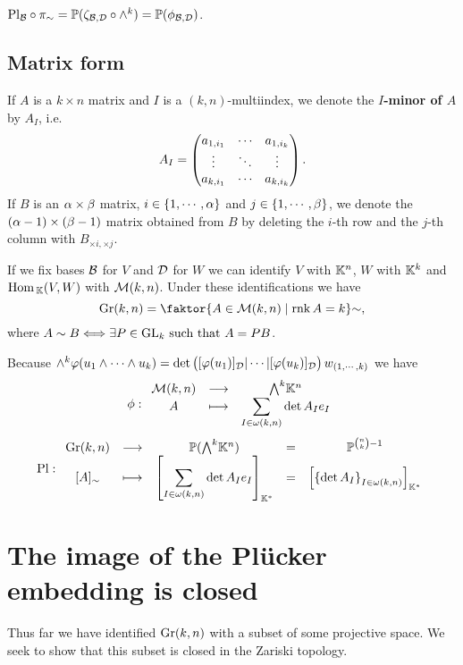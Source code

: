 \begin{remark}
$\mathrm{Pl}_{\mathcal{B}}\circ \pi_\sim=\mathbb{P}(\zeta_{\mathcal{B},\mathcal{D}}\circ\wedge^k)=\mathbb{P}(\phi_{\mathcal{B},\mathcal{D}})$.
\end{remark}



\subsection{Matrix form}
\begin{notation}
If $A$ is a $k\times n$ matrix and $I$ is a $(k,n)$-multiindex, we denote the \textbf{$I$-minor of $A$} by $A_I$, i.e.
\[A_I=\begin{pmatrix}a_{1,i_1} &\cdots &a_{1,i_{k}}\\\vdots &\ddots &\vdots\\a_{k,i_1}&\cdots&a_{k,i_k}\end{pmatrix}.\]
If $B$ is an $\alpha\times \beta$ matrix, $i\in\left\{{1,\cdots, \alpha}\right\}$ and $j\in \left\{{1,\cdots, \beta}\right\}$, we denote the $(\alpha-1)\times (\beta-1)$ matrix obtained from $B$ by deleting the $i$-th row and the $j$-th column with $B_{\times i,\times j}$.
\end{notation}
If we fix bases $\mathcal{B}$ for $V$ and $\mathcal{D}$ for $W$ we can identify $V$ with $\mathbb{K}^n$, $W$ with $\mathbb{K}^k$ and $\mathrm{Hom}\,_{\mathbb{K}}(V,W)$ with $\mathcal{M}(k,n)$. Under these identifications we have 
\[\Gr(k,n)=\quot{\cpa{A\in \Mc(k,n)\mid \rnk A=k}}{\sim},\] 
where $A\sim B\Longleftrightarrow \exists P\in \mathrm{GL}_k\text{ such that } A=PB$.\bigskip

Because $\wedge^k\varphi(u_1\wedge\cdots\wedge u_k)=\det\begin{pmatrix}[\varphi(u_1)]_{\mathcal{D}}|\cdots|[\varphi(u_k)]_{\mathcal{D}}\end{pmatrix} w_{(1,\cdots,k)}$ we have
\[\phi:\funcDef{\Mc(k,n)}{\bw \K^n}{A}{\displaystyle \sum_{I\in \omega(k,n)}\det A_I e_I}\]
\[\Pl:\begin{array}{ccccc}
{\Gr(k,n)} & \longrightarrow & {\Pj(\bw \K^n)} & = & \Pj^{\binom nk-1}\\
{[A]_\sim} & \longmapsto & {\displaystyle \spa{\sum_{I\in \omega(k,n)}\det A_I e_I}_{\K^\ast}} & = & \spa{\cpa{\det A_I}_{I\in\omega(k,n)}}_{\K^\ast}
\end{array}\]







\section{The image of the Pl\"ucker embedding is closed}\label{ImagePluckerEmbeddingIsClosed}
Thus far we have identified $\mathrm{Gr}(k,n)$ with a subset of some projective space. We seek to show that this subset is closed in the Zariski topology.

